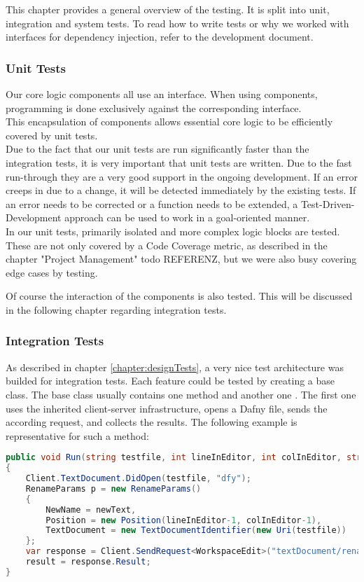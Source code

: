 This chapter provides a general overview of the testing.
It is split into unit, integration and system tests.
To read how to write tests or why we worked with interfaces for dependency injection, refer to the development document.

\subsubsection{Unit Tests}
Our core logic components all use an interface.
When using components, programming is done exclusively against the corresponding interface. \\

This encapsulation of components allows essential core logic to be efficiently covered by unit tests. \\

Due to the fact that our unit tests are run significantly faster than the integration tests, it is very important that unit tests are written.
Due to the fast run-through they are a very good support in the ongoing development.
If an error creeps in due to a change, it will be detected immediately by the existing tests.
If an error needs to be corrected or a function needs to be extended, a Test-Driven-Development approach can be used to work in a goal-oriented manner. \\

In our unit tests, primarily isolated and more complex logic blocks are tested.
These are not only covered by a Code Coverage metric, as described in the chapter "Project Management" todo REFERENZ, but we were also busy covering edge cases by testing.

Of course the interaction of the components is also tested.
This will be discussed in the following chapter regarding integration tests.

\subsubsection{Integration Tests}
As described in chapter \ref{chapter:designTests}, a very nice test architecture was builded for integration tests.
Each feature could be tested by creating a base class.
The base class usually contains one method  and another one .
The first one uses the inherited client-server infrastructure, opens a Dafny file, sends the according request, and collects the results.
The following example is representative for such a method:

\begin{lstlisting}[language=csharp, caption={Finding a Declaration}, captionpos=b, label={lst:visitorfinddecl}]
public void Run(string testfile, int lineInEditor, int colInEditor, string newText = "newText")
{
    Client.TextDocument.DidOpen(testfile, "dfy");
    RenameParams p = new RenameParams()
    {
        NewName = newText,
        Position = new Position(lineInEditor-1, colInEditor-1),
        TextDocument = new TextDocumentIdentifier(new Uri(testfile))
    };
    var response = Client.SendRequest<WorkspaceEdit>("textDocument/rename", p, CancellationSource.Token);
    result = response.Result;
}
\end{lstlisting}


